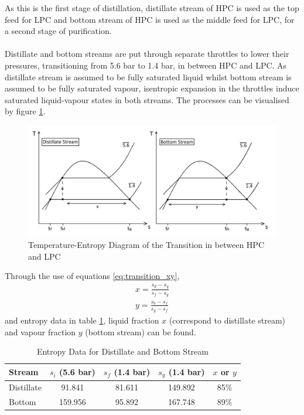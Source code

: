 \documentclass[11pt,oneside]{article}
\begin{document}
        As this is the first stage of distillation, distillate stream of HPC is used as the top feed for LPC and bottom stream of HPC is used as the middle feed for LPC, for a second stage of purification.\\
        \\
        Distillate and bottom streams are put through separate throttles to lower their pressures, transitioning from 5.6 bar to 1.4 bar, in between HPC and LPC. As distillate stream is assumed to be fully saturated liquid whilst bottom stream is assumed to be fully saturated vapour, isentropic expansion in the throttles induce saturated liquid-vapour states in both streams. The processes can be visualised by figure \ref{transition_T-S_diagram}. \\
        \begin{figure}[H]
            \centering
	        \includegraphics[width=1.00\linewidth]{transition_T-S_diagram.jpg}
	        \caption{Temperature-Entropy Diagram of the Transition in between HPC and LPC}
	        \label{transition_T-S_diagram}
        \end{figure} 
        \noindent Through the use of equations \ref{eq:transition_xy},
        \begin{equation}
            \begin{aligned}
                x = \frac{s_d-s_g}{s_f-s_g} \\
                y = \frac{s_b-s_f}{s_g-s_f}
            \end{aligned}
            \label{eq:transition_xy}
        \end{equation}
        and entropy data in table \ref{table:transition_entropy}, liquid fraction $x$ (correspond to distillate stream) and vapour fraction $y$ (bottom stream) can be found. \\
        \begin{table}[H]
        \centering
            \singlespacing
	        \caption{Entropy Data for Distillate and Bottom Stream}
	        \label{table:transition_entropy}
	
	        \begin{tabular}{|l|c|cc|c|}
	        \hline
	        Stream      	& $s_i$ (5.6 bar)   & $s_f$ (1.4 bar)   & $s_g$ (1.4 bar)   & $x$ or $y$     \\
	        \hline
	        Distillate		& 91.841			& 81.611            & 149.892           & 85\% \\
	        Bottom			& 159.956   	    & 95.892            & 167.748           & 89\% \\
	        \hline
	        \end{tabular}
        \end{table}
\end{document}
